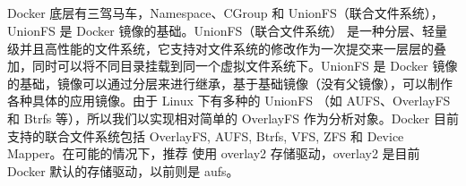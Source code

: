 \documentclass[../../../interview-questions.tex]{subfiles}
\begin{document}
\subsection{\color{red}{容器三把斧之OverlayFS原理与实现}}

Docker 底层有三驾马车，Namespace、CGroup 和 UnionFS（联合文件系统），UnionFS 是 Docker 镜像的基础。UnionFS（联合文件系统） 是一种分层、轻量级并且高性能的文件系统，它支持对文件系统的修改作为一次提交来一层层的叠加，同时可以将不同目录挂载到同一个虚拟文件系统下。UnionFS 是 Docker 镜像的基础，镜像可以通过分层来进行继承，基于基础镜像（没有父镜像），可以制作各种具体的应用镜像。由于 Linux 下有多种的 UnionFS （如 AUFS、OverlayFS 和 Btrfs 等），所以我们以实现相对简单的 OverlayFS 作为分析对象。Docker 目前支持的联合文件系统包括 OverlayFS, AUFS, Btrfs, VFS, ZFS 和 Device Mapper。在可能的情况下，推荐 使用 overlay2 存储驱动，overlay2 是目前 Docker 默认的存储驱动，以前则是 aufs。
\end{document}

